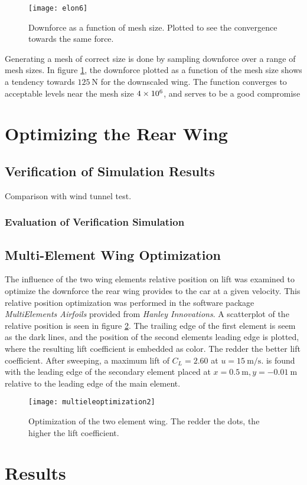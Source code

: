   \begin{figure}
    \texttt{[image: elon6]}
    \label{fig:DFprmeshsize}
    \caption{Downforce as a function of mesh size. Plotted to see the convergence towards the same force.}
  \end{figure}

  Generating a mesh of correct size is done by sampling downforce over a range of mesh sizes. In figure \ref{fig:DFprmeshsize}, the downforce plotted as a function of the mesh size shows a tendency towards $\SI{125}{\newton}$ for the downscaled wing. The function converges to acceptable levels near the mesh size $\SI{4E6}{}$, and serves to be a good compromise

\section{Optimizing the Rear Wing}


  \subsection{Verification of Simulation Results}
  \label{sec:simulationcomparison}

  Comparison with wind tunnel test.

  \subsubsection{Evaluation of Verification Simulation}

  \subsection{Multi-Element Wing Optimization}
  The influence of the two wing elements relative position on lift was examined to optimize the downforce the rear wing provides to the car at a given velocity. This relative position optimization was performed in the software package \emph{MultiElements Airfoils} provided from \emph{Hanley Innovations}. A scatterplot of the relative position is seen in figure \ref{fig:multieleoptimization}. The trailing edge of the first element is seem as the dark lines, and the position of the second elements leading edge is plotted, where the resulting lift coefficient is embedded as color. The redder the better lift coefficient. After sweeping, a maximum lift of $C_L = 2.60$  at $u = \SI{15}{\metre\per\second}$. is found with the leading edge of the secondary element placed at $x=\SI{0.5}{\metre},y=\SI{-0.01}{\metre}$ relative to the leading edge of the main element.

  \begin{figure}
    \texttt{[image: multieleoptimization2]}
    \label{fig:multieleoptimization}
    \caption{Optimization of the two element wing. The redder the dots, the higher the lift coefficient.}
  \end{figure}

\section{Results}
